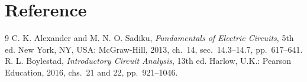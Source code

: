 \documentclass[12pt,a4paper]{article}
\begin{document}
	\section{Reference}
	\renewcommand{\refname}{} %
	\begin{thebibliography}{9}
		 C. K. Alexander and M. N. O. Sadiku,
		\textit{Fundamentals of Electric Circuits}, 5th ed. New York,
		NY, USA: McGraw-Hill, 2013, ch.~14, sec.~14.3--14.7,
		pp.~617--641.
		 R. L. Boylestad, \textit{Introductory
			Circuit Analysis}, 13th ed. Harlow, U.K.: Pearson Education,
		2016, chs.~21 and 22, pp.~921--1046.
	\end{thebibliography}
	
\end{document}
